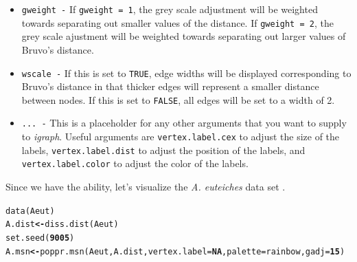 \documentclass[letterpaper]{article}\usepackage[]{graphicx}\usepackage[]{color}
\makeatletter
\newcommand{\hlnum}[1]{\textcolor[rgb]{0.502,0,0.502}{\textbf{#1}}}%
\newcommand{\hlstd}[1]{\textcolor[rgb]{0,0,0}{#1}}%
\newcommand{\hlkwb}[1]{\textcolor[rgb]{0.502,0.502,0.753}{\textbf{#1}}}%
\newcommand{\hlkwc}[1]{\textcolor[rgb]{0,0.502,0.753}{#1}}%
\newcommand{\hlkwd}[1]{\textcolor[rgb]{0,0.267,0.4}{#1}}%
\newenvironment{kframe}{%
 \def\at@end@of@kframe{}%
 \ifinner\ifhmode%
  \def\at@end@of@kframe{\end{minipage}}%
  \begin{minipage}{\columnwidth}%
 \fi\fi%
 \def\FrameCommand##1{\hskip\@totalleftmargin \hskip-\fboxsep
 \colorbox{shadecolor}{##1}\hskip-\fboxsep
     \hskip-\linewidth \hskip-\@totalleftmargin \hskip\columnwidth}%
 \MakeFramed {\advance\hsize-\width
   \@totalleftmargin\z@ \linewidth\hsize
   \@setminipage}}%
 {\par\unskip\endMakeFramed%
 \at@end@of@kframe}
\newenvironment{knitrout}{}{} %
\makeatother
\begin{document}
\begin{itemize}
  \item \texttt{gweight -} If \texttt{gweight = 1}, the grey scale adjustment will be weighted towards separating out smaller values of the distance. If \texttt{gweight = 2}, the grey scale ajustment will be weighted towards separating out larger values of Bruvo's distance.
  \item \texttt{wscale -} If this is set to \texttt{TRUE}, edge widths will be displayed corresponding to Bruvo's distance in that thicker edges will represent a smaller distance between nodes. If this is set to \texttt{FALSE}, all edges will be set to a width of 2. 
  \item \texttt{... -} This is a placeholder for any other arguments that you want to supply to \textit{igraph}. Useful arguments are \texttt{vertex.label.cex} to adjust the size of the labels, \texttt{vertex.label.dist} to adjust the position of the labels, and \texttt{vertex.label.color} to adjust the color of the labels.
\end{itemize}

Since we have the ability, let's visualize the \textit{A. euteiches} data set \cite{Grunwald:2006}.
\begin{knitrout}\footnotesize
{}\color{fgcolor}\begin{kframe}
\begin{alltt}
\hlkwd{data}\hlstd{(Aeut)}
\hlstd{A.dist} \hlkwb{<-} \hlkwd{diss.dist}\hlstd{(Aeut)}
\hlkwd{set.seed}\hlstd{(}\hlnum{9005}\hlstd{)}
\hlstd{A.msn} \hlkwb{<-} \hlkwd{poppr.msn}\hlstd{(Aeut, A.dist,} \hlkwc{vertex.label} \hlstd{=} \hlnum{NA}\hlstd{,} \hlkwc{palette} \hlstd{= rainbow,} \hlkwc{gadj} \hlstd{=} \hlnum{15}\hlstd{)}
\end{alltt}
\end{kframe}
\end{knitrout}
\end{document}
